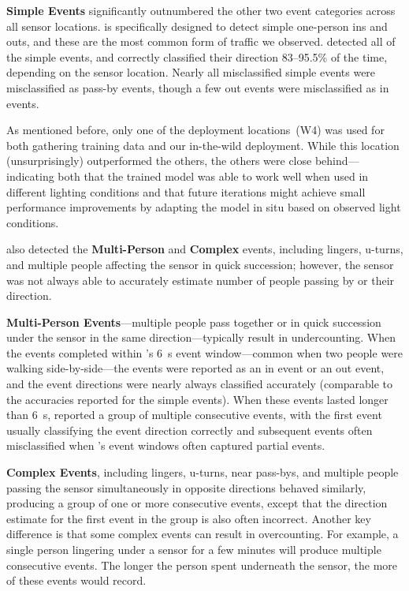 \textbf{Simple Events} significantly outnumbered the other two event categories across all sensor locations.
\sysname is specifically designed to detect simple one-person ins and outs, and these are the most common form of traffic we observed.
\sysname detected all of the simple events, and correctly classified their direction 83--95.5\% of the time, depending on the sensor location.
Nearly all misclassified simple events were misclassified as pass-by events, though a few out events were misclassified as in events. 

As mentioned before, only one of the deployment locations~(W4) was used for both gathering training data and our in-the-wild deployment.
While this location (unsurprisingly) outperformed the others, the others were close behind---indicating both that the trained model was able to work well when used in different lighting conditions and that future \sysname iterations might achieve small performance improvements by adapting the model in situ based on observed light conditions. 


\sysname also detected the \textbf{Multi-Person} and \textbf{Complex} events, including lingers, u-turns, and multiple people affecting the sensor in quick succession; however, the sensor was not always able to accurately estimate number of people passing by or their direction.

\textbf{Multi-Person Events}---multiple people pass together or in quick succession under the sensor in the same direction---typically result in undercounting. 
When the events completed within \sysname's \SI{6}{\second} event window---common when two people were walking side-by-side---the events were reported as an in event or an out event, and the event directions were nearly always classified accurately (comparable to the accuracies reported for the simple events).
%
When these events lasted longer than \SI{6}{\second}, \sysname reported a group of multiple consecutive events, with the first event usually classifying the event direction correctly and subsequent events often misclassified when \sysname's event windows often captured partial events.

\textbf{Complex Events}, including lingers, u-turns, near pass-bys, and multiple people passing the sensor simultaneously in opposite directions behaved similarly, producing a group of one or more consecutive events, except that the direction estimate for the first event in the group is also often incorrect.
Another key difference is that some complex events can result in overcounting.
For example, a single person lingering under a \sysname sensor for a few minutes will produce multiple consecutive events.
The longer the person spent underneath the sensor, the more of these events \sysname would record.


